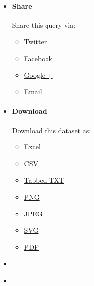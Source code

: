 \documentclass[
]{article}
\providecommand{\tightlist}{%
  \setlength{\itemsep}{0pt}\setlength{\parskip}{0pt}}
\begin{document}
\hypertarget{divreportcontent}{}
\hypertarget{widget}{}
\hypertarget{widgetOptions}{}
\hypertarget{embedLinks}{}
\begin{itemize}
\tightlist
\item
  \protect\hypertarget{shareLink}{\href{javascript:void(0)}{{}}}

  \hypertarget{shareLinkDesc}{}
  \hypertarget{share}{%
  \paragraph{\texorpdfstring{Share{}}{Share}}\label{share}}

  Share this query via:

  \begin{itemize}
  \tightlist
  \item
    \href{Javascript:Widgettwitter()}{Twitter}
  \item
    \href{Javascript:Widgetfacebook();}{Facebook}
  \item
    \href{Javascript:WidgetGooglePlus();}{Google +}
  \item
    \href{Javascript:WidgetEmail();}{Email}
  \end{itemize}
\item
  \protect\hypertarget{downloadLink}{\href{javascript:void(0)}{{}}}

  \hypertarget{downloadLinkDesc}{}
  \hypertarget{download}{%
  \paragraph{\texorpdfstring{Download{}}{Download}}\label{download}}

  Download this dataset as:

  \begin{itemize}
  \tightlist
  \item
    \href{javascript:fileDownloadClick(\textquotesingle{}.file-excel\textquotesingle{})}{Excel}
  \item
    \href{javascript:fileDownloadClick(\textquotesingle{}.file-csv\textquotesingle{})}{CSV}
  \item
    \href{javascript:fileDownloadClick(\textquotesingle{}.file-tab\textquotesingle{})}{Tabbed
    TXT}
  \item
    \href{javascript:exportReport(\textquotesingle{}png\textquotesingle{})}{PNG}
  \item
    \href{javascript:exportReport(\textquotesingle{}jpeg\textquotesingle{})}{JPEG}
  \item
    \href{javascript:exportReport(\textquotesingle{}svg\textquotesingle{})}{SVG}
  \item
    \href{javascript:exportReport(\textquotesingle{}pdf\textquotesingle{})}{PDF}
  \end{itemize}
\item
  \protect\hypertarget{printLink}{\href{javascript:exportReport(\textquotesingle{}print\textquotesingle{})}{{}}}
\item
  \protect\hypertarget{infoLink}{\href{javascript:void(0)}{{}}}


\end{itemize}
\end{document}
